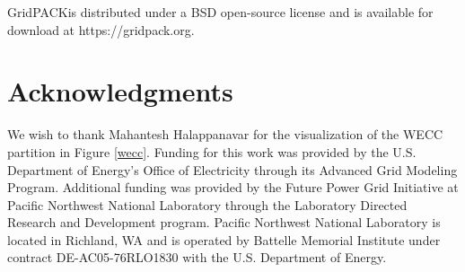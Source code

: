 \documentclass[preprint]{acm_proc_article-sp}
\begin{document}
GridPACK\texttrademark is distributed under a BSD open-source license and is
available for download at https://gridpack.org.

\section{Acknowledgments}
We wish to thank Mahantesh Halappanavar for the visualization of the WECC
partition in Figure \ref{wecc}.
Funding for this work was provided by the U.S. Department of Energy's Office of
Electricity through its Advanced Grid Modeling Program.
Additional funding was provided by the Future Power Grid Initiative at Pacific
Northwest National Laboratory through the Laboratory Directed Research and
Development program.
Pacific Northwest National Laboratory is located in Richland, WA and is operated
by Battelle Memorial Institute under contract DE-AC05-76RLO1830 with the U.S.
Department of Energy.



\end{document}
